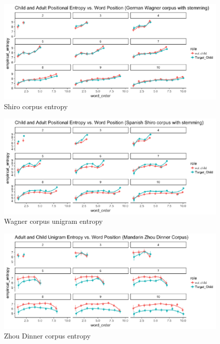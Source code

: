 \documentclass[10pt, letterpaper]{article}
\newenvironment{CodeChunk}{}{}
\begin{document}
\begin{CodeChunk}
\begin{figure}[h]

{\centering \includegraphics{figs/shiro_PE-1} 

}

\caption[Shiro corpus entropy]{Shiro corpus entropy}\label{fig:shiro_PE}
\end{figure}
\end{CodeChunk}

\begin{CodeChunk}
\begin{figure}[h]

{\centering \includegraphics{figs/wagner_PE-1} 

}

\caption[Wagner corpus unigram entropy]{Wagner corpus unigram entropy}\label{fig:wagner_PE}
\end{figure}
\end{CodeChunk}

\begin{CodeChunk}
\begin{figure}[h]

{\centering \includegraphics{figs/zhou_PE-1} 

}

\caption[Zhou Dinner corpus entropy]{Zhou Dinner corpus entropy}\label{fig:zhou_PE}
\end{figure}
\end{CodeChunk}
\end{document}
